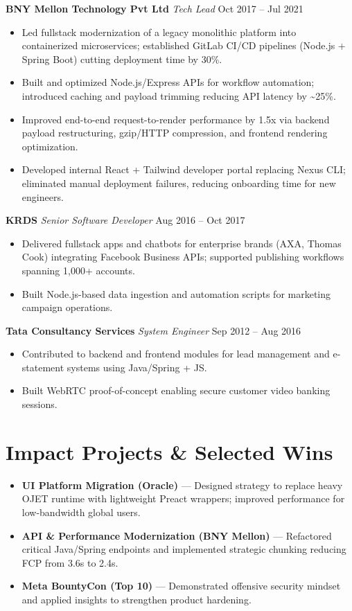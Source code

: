 \documentclass[a4paper,10pt]{article}
\begin{document}
\textbf{BNY Mellon Technology Pvt Ltd} \hfill \textit{Tech Lead} \hfill Oct 2017 -- Jul 2021
\begin{itemize}
  \item Led fullstack modernization of a legacy monolithic platform into containerized microservices; established GitLab CI/CD pipelines (Node.js + Spring Boot) cutting deployment time by 30\%.
  \item Built and optimized Node.js/Express APIs for workflow automation; introduced caching and payload trimming reducing API latency by \textasciitilde25\%.
  \item Improved end-to-end request-to-render performance by 1.5x via backend payload restructuring, gzip/HTTP compression, and frontend rendering optimization.
  \item Developed internal React + Tailwind developer portal replacing Nexus CLI; eliminated manual deployment failures, reducing onboarding time for new engineers.
\end{itemize}

\textbf{KRDS} \hfill \textit{Senior Software Developer} \hfill Aug 2016 -- Oct 2017
\begin{itemize}
  \item Delivered fullstack apps and chatbots for enterprise brands (AXA, Thomas Cook) integrating Facebook Business APIs; supported publishing workflows spanning 1,000+ accounts.
  \item Built Node.js-based data ingestion and automation scripts for marketing campaign operations.
\end{itemize}

\textbf{Tata Consultancy Services} \hfill \textit{System Engineer} \hfill Sep 2012 -- Aug 2016
\begin{itemize}
  \item Contributed to backend and frontend modules for lead management and e-statement systems using Java/Spring + JS.
  \item Built WebRTC proof-of-concept enabling secure customer video banking sessions.
\end{itemize}

\section{Impact Projects \& Selected Wins}
\begin{itemize}
  \item \textbf{UI Platform Migration (Oracle)} — Designed strategy to replace heavy OJET runtime with lightweight Preact wrappers; improved performance for low-bandwidth global users.
  \item \textbf{API \& Performance Modernization (BNY Mellon)} — Refactored critical Java/Spring endpoints and implemented strategic chunking reducing FCP from 3.6s to 2.4s.
  \item \textbf{Meta BountyCon (Top 10)} — Demonstrated offensive security mindset and applied insights to strengthen product hardening.
\end{itemize}
\end{document}
